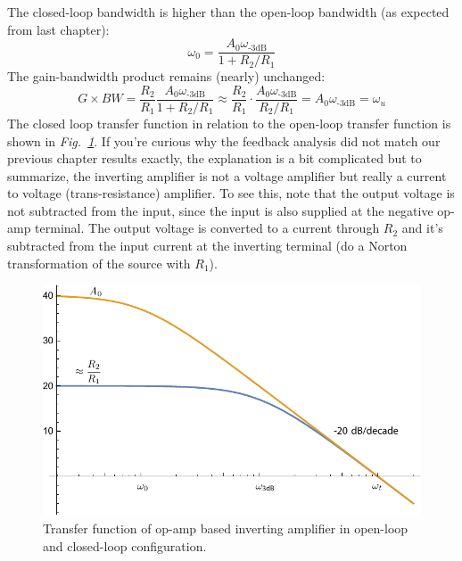 The closed-loop bandwidth is higher than the open-loop bandwidth (as expected from last chapter):
    \begin{equation} 
        \omega_{0} = \frac{A_0 \omega_{\text{-3dB}}}{ 1 + R_2/R_1} 
    \end{equation}
The gain-bandwidth product remains (nearly) unchanged:
    \begin{equation} 
        G \times BW = \frac{R_2}{R_1} \frac{A_0 \omega_\text{-3dB}}{ 1 + R_2/R_1} \approx \frac{R_2}{R_1} \cdot \frac{A_0 \omega_\text{-3dB}}{R_2/R_1} = A_0 \omega_\text{-3dB} = \omega_u
    \end{equation}
The closed loop transfer function in relation to the open-loop transfer function is shown in \emph{Fig.~\ref{fig:mag1pole_fb_label}}.  If you're curious why the feedback analysis did not match our previous chapter results exactly, the explanation is a bit complicated but to summarize, the inverting amplifier is not a voltage amplifier but really a current to voltage (trans-resistance) amplifier.  To see this, note that the output voltage is not subtracted from the input, since the input is also supplied at the negative op-amp terminal. The output voltage is converted to a current through $R_2$ and it's subtracted from the input current at the inverting terminal (do a Norton transformation of the source with $R_1$).
\begin{figure}[tb]
\centering
\includegraphics[scale=1]{mag1pole_fb_label}
\caption{Transfer function of op-amp based inverting amplifier in open-loop and closed-loop configuration.}
\label{fig:mag1pole_fb_label}
\end{figure}
